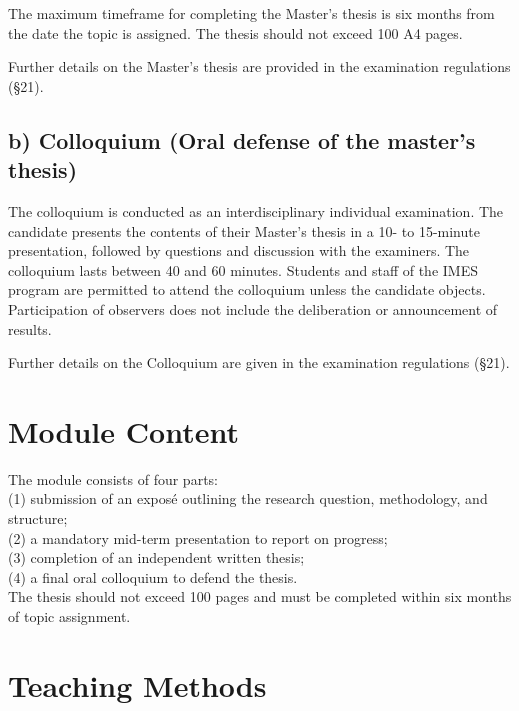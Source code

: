 \documentclass[
  letterpaper,
  10pt,
  openany]{book}
\begin{document}
The maximum timeframe for completing the Master's thesis is six months
from the date the topic is assigned. The thesis should not exceed 100 A4
pages.

Further details on the Master's thesis are provided in the examination
regulations (§21).

\subsection*{b) Colloquium (Oral defense of the master's
thesis)}\label{b-colloquium-oral-defense-of-the-masters-thesis}

The colloquium is conducted as an interdisciplinary individual
examination. The candidate presents the contents of their Master's
thesis in a 10- to 15-minute presentation, followed by questions and
discussion with the examiners. The colloquium lasts between 40 and 60
minutes. Students and staff of the IMES program are permitted to attend
the colloquium unless the candidate objects. Participation of observers
does not include the deliberation or announcement of results.

Further details on the Colloquium are given in the examination
regulations (§21).

\section*{Module Content}\label{module-content-5}


The module consists of four parts:\\
(1) submission of an exposé outlining the research question,
methodology, and structure;\\
(2) a mandatory mid-term presentation to report on progress;\\
(3) completion of an independent written thesis;\\
(4) a final oral colloquium to defend the thesis.\\
The thesis should not exceed 100 pages and must be completed within six
months of topic assignment.

\section*{Teaching Methods}\label{teaching-methods-5}
\end{document}
